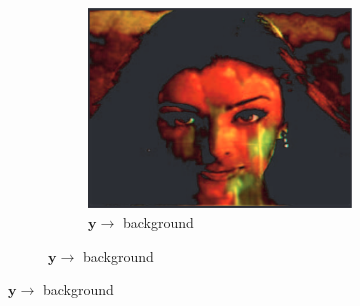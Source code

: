 \begin{figure}
\begin{subfigure}{0.8\textwidth}
        \hfill
        \begin{subfigure}{0.34\textwidth}
            \centering
            \includegraphics[width=\textwidth]{images/01-uncompensated.png}
            \caption{\(\bm{y} \rightarrow\) background}
            \label{fig:intro_grossberg-uncompensated}
        \end{subfigure}
        

\end{subfigure}
\end{figure}
